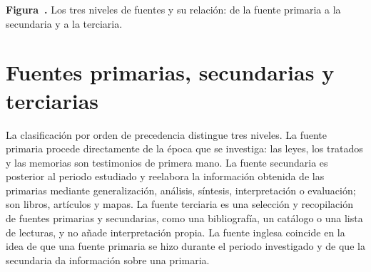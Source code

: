 \documentclass{book}
\newcounter{studiumfigure}
\begin{document}
\begin{minipage}{\linewidth}
%
\fi
\fi
\endgroup
\par\nopagebreak
{\small {}\label{fig:tipos-de-fuentes}\textbf{Figura~\thestudiumfigure.} Los tres niveles de fuentes y su relación: de la fuente primaria a la secundaria y a la terciaria.\par}
\end{minipage}
\par\vspace{\baselineskip}

\section{Fuentes primarias, secundarias y terciarias}

La clasificación por orden de precedencia distingue tres niveles. La fuente primaria procede directamente de la época que se investiga: las leyes, los tratados y las memorias son testimonios de primera mano. La fuente secundaria es posterior al periodo estudiado y reelabora la información obtenida de las primarias mediante generalización, análisis, síntesis, interpretación o evaluación; son libros, artículos y mapas. La fuente terciaria es una selección y recopilación de fuentes primarias y secundarias, como una bibliografía, un catálogo o una lista de lecturas, y no añade interpretación propia. La fuente inglesa coincide en la idea de que una fuente primaria se hizo durante el periodo investigado y de que la secundaria da información sobre una primaria.
\end{document}
